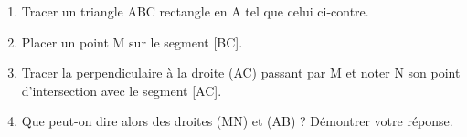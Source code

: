 \documentclass[exercice]{thedocument}%
\begin{document}
%
\begin{enumerate}
    \item Tracer un triangle ABC rectangle en A tel que celui ci-contre.
    \item Placer un point M sur le segment [BC].
    \item Tracer la perpendiculaire à la droite (AC) passant par M et noter
    N son point d'intersection avec le segment [AC].
    \item Que peut-on dire alors des droites (MN) et (AB) ? Démontrer votre
    réponse.
\end{enumerate}
\end{document}
